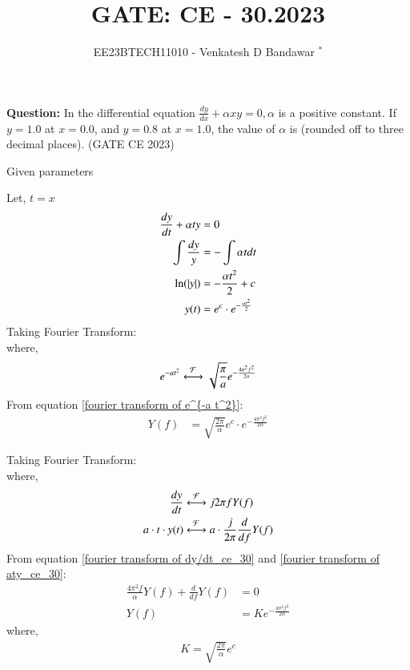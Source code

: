 \documentclass[journal,12pt,twocolumn]{IEEEtran}
\theoremstyle{remark}
\begin{document}

\vspace{3cm}

\title{GATE: CE - 30.2023}
\author{EE23BTECH11010 - Venkatesh D Bandawar $^{*}$%
}
\maketitle
\bigskip


\textbf{Question:} In the differential equation $\frac{dy}{dx} + \alpha x y = 0, \alpha$ is a positive constant. If $y = 1.0$ at
$x = 0.0$, and $y = 0.8$ at $x = 1.0$, the value of $\alpha$ is (rounded off to three decimal places).  \hfill(GATE CE 2023)

\solution
\begin{table}[!h] 
\centering

\caption{Given parameters}
\label{given parameters list.gate.ce.30}
\end{table}

Let, $t=x$
\begin{align}
    \frac{dy}{dt} + \alpha t y &= 0\\
    \int \frac{dy}{y} &= - \int \alpha t dt\\
    \ln(\left\vert y\right\vert) &= - \frac{\alpha t^2}{2} + c\\
    y(t) &= e^c\cdot e^{- \frac{\alpha t^2}{2}} 
\end{align}
Taking Fourier Transform:\\
where,
\begin{align}
    e^{-a t^2} \system{\mathcal{F}} \sqrt{\frac{\pi}{a}} e^{-\frac{4\pi^2 f^2}{2\alpha}}\label{fourier transform of e^{-a t^2}}
\end{align}
From equation \eqref{fourier transform of e^{-a t^2}}:
\begin{align}
     Y(f) &=  \sqrt{\frac{2\pi}{\alpha}}e^c \cdot e^{-\frac{4\pi^2 f^2}{2\alpha}}
\end{align}

Taking Fourier Transform:\\
where,
\begin{align}
    \frac{dy}{dt} & \system{\mathcal{F}} j 2\pi f Y(f) \label{fourier transform of dy/dt_ce_30}\\
    a \cdot t \cdot y(t) & \system{\mathcal{F}} a \cdot \frac{j}{2\pi} \frac{d}{df} Y(f)\label{fourier transform of aty_ce_30}
\end{align}
From equation \eqref{fourier transform of dy/dt_ce_30} and \eqref{fourier transform of aty_ce_30}:
\begin{align}
    \frac{4\pi^2 f}{\alpha} Y(f) + \frac{d}{df} Y(f) &= 0\\
    Y(f) &= K e^{-\frac{4\pi^2 f^2}{2\alpha}}
\end{align}
where, 
\begin{align}
    K =  \sqrt{\frac{2\pi}{\alpha}}e^c
\end{align}
\end{document}
